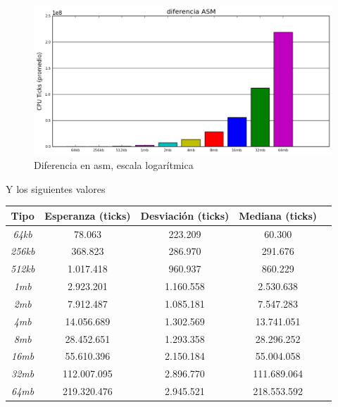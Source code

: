 \documentclass[a4paper]{article}
\begin{document}
\begin{figure}[h]
	\centerline{\includegraphics[scale=0.78]{imagenes/test_performance_size_ASM_bar.png}}
	\caption{Diferencia en asm, escala logarítmica}
\end{figure}

Y los siguientes valores


\begin{center}
        \begin{tabular}[c]{|c|c|c|c|c|}
    \hline
        \textbf{Tipo} &  \textbf{Esperanza (ticks)} & \textbf{Desviación (ticks)} & \textbf{Mediana (ticks)}\\
        \hline
\textit{64kb} &    78.063  & 223.209 & 60.300\\
        \hline
\textit{256kb} &   368.823    & 286.970 & 291.676\\
        \hline
\textit{512kb} &  1.017.418   & 960.937 & 860.229 \\
        \hline
\textit{1mb} &  2.923.201  & 1.160.558 & 2.530.638\\
        \hline
\textit{2mb} &  7.912.487   & 1.085.181 & 7.547.283\\
        \hline
\textit{4mb} &  14.056.689 & 1.302.569 & 13.741.051\\
        \hline
\textit{8mb} &  28.452.651 & 1.293.358 & 28.296.252\\
        \hline
\textit{16mb} &  55.610.396 & 2.150.184 & 55.004.058\\
        \hline
\textit{32mb} &  112.007.095 & 2.896.770 & 111.689.064\\
        \hline
\textit{64mb} &  219.320.476 & 2.945.521 & 218.553.592\\
        \hline
    \end{tabular}
\end{center}
\end{document}
